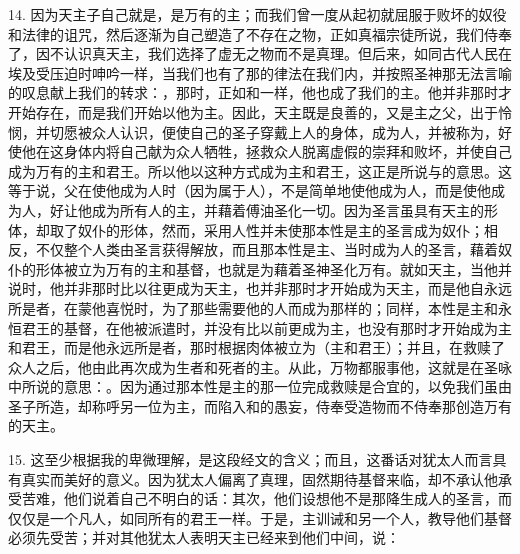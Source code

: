 14. 因为天主子自己就是，是万有的主；而我们曾一度从起初就屈服于败坏的奴役和法律的诅咒，然后逐渐为自己塑造了不存在之物，正如真福宗徒所说，我们侍奉了，因不认识真天主，我们选择了虚无之物而不是真理。但后来，如同古代人民在埃及受压迫时呻吟一样，当我们也有了那的律法在我们内，并按照圣神那无法言喻的叹息献上我们的转求：，那时，正如和一样，他也成了我们的主。他并非那时才开始存在，而是我们开始以他为主。因此，天主既是良善的，又是主之父，出于怜悯，并切愿被众人认识，便使自己的圣子穿戴上人的身体，成为人，并被称为，好使他在这身体内将自己献为众人牺牲，拯救众人脱离虚假的崇拜和败坏，并使自己成为万有的主和君王。所以他以这种方式成为主和君王，这正是所说与的意思。这等于说，父在使他成为人时（因为属于人），不是简单地使他成为人，而是使他成为人，好让他成为所有人的主，并藉着傅油圣化一切。因为圣言虽具有天主的形体，却取了奴仆的形体，然而，采用人性并未使那本性是主的圣言成为奴仆；相反，不仅整个人类由圣言获得解放，而且那本性是主、当时成为人的圣言，藉着奴仆的形体被立为万有的主和基督，也就是为藉着圣神圣化万有。就如天主，当他并说时，他并非那时比以往更成为天主，也并非那时才开始成为天主，而是他自永远所是者，在蒙他喜悦时，为了那些需要他的人而成为那样的；同样，本性是主和永恒君王的基督，在他被派遣时，并没有比以前更成为主，也没有那时才开始成为主和君王，而是他永远所是者，那时根据肉体被立为（主和君王）；并且，在救赎了众人之后，他由此再次成为生者和死者的主。从此，万物都服事他，这就是在圣咏中所说的意思：。因为通过那本性是主的那一位完成救赎是合宜的，以免我们虽由圣子所造，却称呼另一位为主，而陷入和的愚妄，侍奉受造物而不侍奉那创造万有的天主。\par

15. 这至少根据我的卑微理解，是这段经文的含义；而且，这番话对犹太人而言具有真实而美好的意义。因为犹太人偏离了真理，固然期待基督来临，却不承认他承受苦难，他们说着自己不明白的话：其次，他们设想他不是那降生成人的圣言，而仅仅是一个凡人，如同所有的君王一样。于是，主训诫和另一个人，教导他们基督必须先受苦；并对其他犹太人表明天主已经来到他们中间，说：\par

